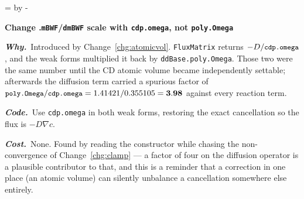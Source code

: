 \documentclass[11pt,a4paper]{article}
\newcommand{\code}[1]{\texttt{\small #1}}
\newcommand{\needlines}[1]{%
  \par\dimen0=\pagegoal \advance\dimen0 by -\pagetotal
  \ifdim\dimen0<#1\baselineskip \newpage \fi}
\newcounter{chg}
\newcommand{\change}[1]{%
  \needlines{4}%
  \refstepcounter{chg}%
  \par\medskip\noindent
  {\bfseries\boldmath Change \thechg.\quad #1}%
  \par\nobreak\smallskip}
\newcommand{\why}[1]{\par\noindent\textbf{\itshape Why.}\ #1\par}
\newcommand{\impact}[1]{\par\noindent\textbf{\itshape Code.}\ #1\par}
\newcommand{\cost}[1]{\par\noindent\textbf{\itshape Cost.}\ #1\par}
\begin{document}
\change{\code{mBWF}/\code{dmBWF} scale with \code{cdp.omega}, not \code{poly.Omega}}
\label{chg:omegacancel}
\why{Introduced by Change~\ref{chg:atomicvol}. \code{FluxMatrix} returns
$-D/\code{cdp.omega}$, and the weak forms multiplied it back by
\code{ddBase.poly.Omega}. Those two were the same number until the CD atomic
volume became independently settable; afterwards the diffusion term carried a
spurious factor of $\code{poly.Omega}/\code{cdp.omega} = 1.41421/0.355105 =
\mathbf{3.98}$ against every reaction term.}
\impact{Use \code{cdp.omega} in both weak forms, restoring the exact
cancellation so the flux is $-D\nabla c$.}
\cost{None. Found by reading the constructor while chasing the
non-convergence of Change~\ref{chg:clamp} --- a factor of four on the
diffusion operator is a plausible contributor to that, and this is a reminder
that a correction in one place (an atomic volume) can silently unbalance a
cancellation somewhere else entirely.}
\end{document}
